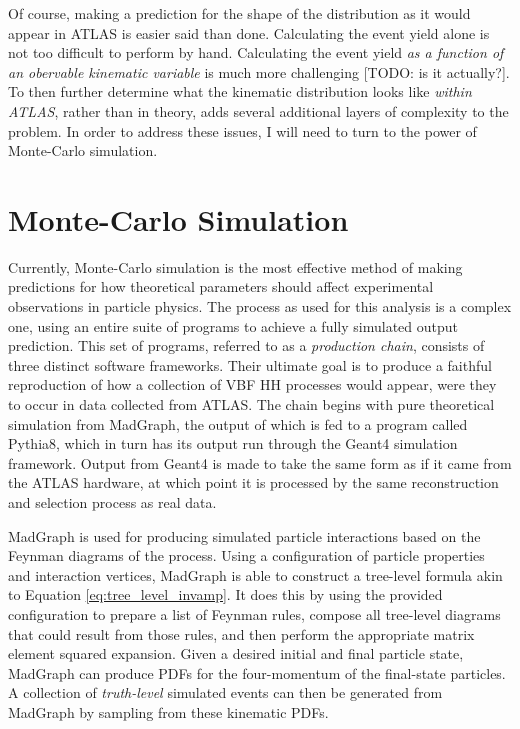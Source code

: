     Of course, making a prediction for the shape of the \mhh distribution as it would appear in ATLAS is easier said than done.
    Calculating the event yield alone is not too difficult to perform by hand.
    Calculating the event yield \textit{as a function of an obervable kinematic variable} is much more challenging [TODO: is it actually?].
    To then further determine what the kinematic distribution looks like \textit{within ATLAS}, rather than in theory,
        adds several additional layers of complexity to the problem.
    In order to address these issues, I will need to turn to the power of Monte-Carlo simulation.


\section{Monte-Carlo Simulation} \label{sec:mcsim}
    
    Currently, Monte-Carlo simulation is the most effective method of making predictions
        for how theoretical parameters should affect experimental observations in particle physics.
    The process as used for this analysis is a complex one, using an entire suite of programs to achieve a fully simulated output prediction.
    This set of programs, referred to as a \textit{production chain}, consists of three distinct software frameworks.
    Their ultimate goal is to produce a faithful reproduction of how a collection of VBF \to HH processes would appear,
        were they to occur in data collected from ATLAS.
    The chain begins with pure theoretical simulation from MadGraph,
        the output of which is fed to a program called Pythia8,
        which in turn has its output run through the Geant4 simulation framework.
    Output from Geant4 is made to take the same form as if it came from the ATLAS hardware,
        at which point it is processed by the same reconstruction and selection process as real data.

    MadGraph is used for producing simulated particle interactions based on the Feynman diagrams of the process.
    Using a configuration of particle properties and interaction vertices,
        MadGraph is able to construct a tree-level formula akin to Equation \ref{eq:tree_level_invamp}.
    It does this by using the provided configuration to prepare a list of Feynman rules,
        compose all tree-level diagrams that could result from those rules,
        and then perform the appropriate matrix element squared expansion.
    Given a desired initial and final particle state,
        MadGraph can produce PDFs for the four-momentum of the final-state particles.
    A collection of \textit{truth-level} simulated events can then be generated from MadGraph
        by sampling from these kinematic PDFs.


